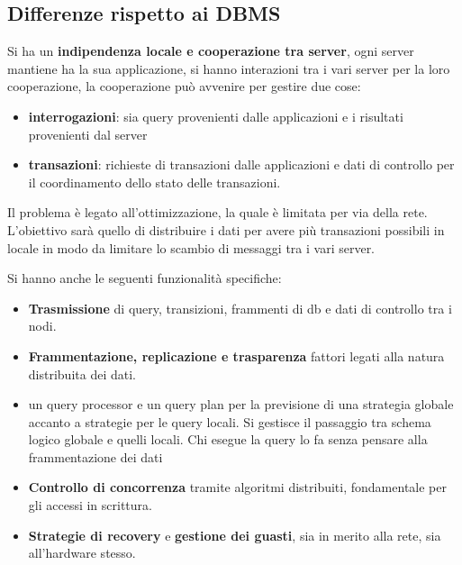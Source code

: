 \subsection{Differenze rispetto ai DBMS}
Si ha un \textbf{indipendenza locale e cooperazione tra server}, ogni server
mantiene ha la sua applicazione, si hanno interazioni tra i vari server per la
loro cooperazione, la cooperazione può avvenire per gestire due cose:
\begin{itemize}
      \item \textbf{interrogazioni}: sia query provenienti dalle applicazioni e
            i risultati provenienti dal server
      \item \textbf{transazioni}: richieste di transazioni dalle applicazioni  e
            dati di controllo per il coordinamento dello stato delle transazioni.
\end{itemize}
Il problema è legato all'ottimizzazione, la quale è limitata per via della rete.
L'obiettivo sarà quello di distribuire i dati per avere più transazioni possibili
in locale in modo da limitare lo scambio di messaggi tra i vari server.

Si hanno anche le seguenti funzionalità specifiche:
\begin{itemize}
      \item \textbf{Trasmissione} di query, transizioni, frammenti di db e dati
            di controllo tra i nodi.
      \item \textbf{Frammentazione, replicazione e trasparenza} fattori legati
            alla natura distribuita dei dati.
      \item un query processor e un query plan per la previsione di una
            strategia globale accanto a strategie per le query locali. Si gestisce
            il passaggio tra schema logico globale e quelli locali. Chi esegue
            la query lo fa senza pensare alla frammentazione dei dati
      \item \textbf{Controllo di concorrenza} tramite algoritmi distribuiti, fondamentale
            per gli accessi in scrittura.
      \item \textbf{Strategie di recovery} e \textbf{gestione dei guasti}, sia
            in merito alla rete, sia all'hardware stesso.
\end{itemize}
